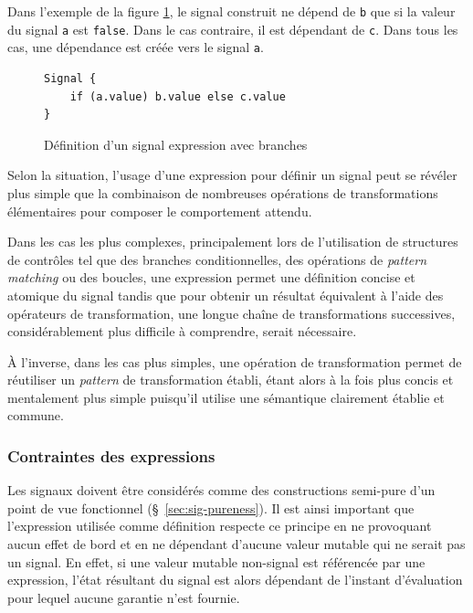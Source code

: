 Dans l'exemple de la figure \ref{fig:signal-expr-branches}, le signal construit ne dépend de \texttt{b} que si la valeur du signal \texttt{a} est \texttt{false}. Dans le cas contraire, il est dépendant de \texttt{c}. Dans tous les cas, une dépendance est créée vers le signal \texttt{a}.

\begin{figure}[!h]
	\begin{lstlisting}
Signal {
	if (a.value) b.value else c.value
}
	\end{lstlisting}
	\caption{Définition d'un signal expression avec branches}
	\label{fig:signal-expr-branches}
\end{figure}

Selon la situation, l'usage d'une expression pour définir un signal peut se révéler plus simple que la combinaison de nombreuses opérations de transformations élémentaires pour composer le comportement attendu.

Dans les cas les plus complexes, principalement lors de l'utilisation de structures de contrôles tel que des branches conditionnelles, des opérations de \emph{pattern matching} ou des boucles, une expression permet une définition concise et atomique du signal tandis que pour obtenir un résultat équivalent à l'aide des opérateurs de transformation, une longue chaîne de transformations successives, considérablement plus difficile à comprendre, serait nécessaire.

À l'inverse, dans les cas plus simples, une opération de transformation permet de réutiliser un \emph{pattern} de transformation établi, étant alors à la fois plus concis et mentalement plus simple puisqu'il utilise une sémantique clairement établie et commune.

\subsubsection{Contraintes des expressions}

Les signaux doivent être considérés comme des constructions semi-pure d'un point de vue fonctionnel (§~\ref{sec:sig-pureness}). Il est ainsi important que l'expression utilisée comme définition respecte ce principe en ne provoquant aucun effet de bord et en ne dépendant d'aucune valeur mutable qui ne serait pas un signal. En effet, si une valeur mutable non-signal est référencée par une expression, l'état résultant du signal est alors dépendant de l'instant d'évaluation pour lequel aucune garantie n'est fournie.

